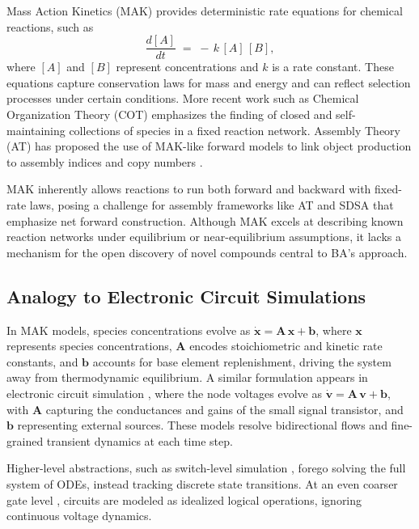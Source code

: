 \documentclass[preprint,12pt]{elsarticle}
\begin{document}
Mass Action Kinetics (MAK) \cite{TuranyiTomlin2014} provides deterministic rate equations for chemical reactions, such as
\[
\frac{d[A]}{dt} \;=\; -\,k\, [A]\,[B],
\]
where $[A]$ and $[B]$ represent concentrations and $k$ is a rate constant. These equations capture conservation laws for mass and energy and can reflect selection processes under certain conditions. More recent work such as Chemical Organization Theory (COT) \cite{DittrichFenizio2005} emphasizes the finding of closed and self-maintaining collections of species in a fixed reaction network. Assembly Theory (AT) has proposed the use of MAK-like forward models to link object production to assembly indices and copy numbers \cite{walker2023nature}.

MAK inherently allows reactions to run both forward and backward with fixed-rate laws, posing a challenge for assembly frameworks like AT and SDSA that emphasize net forward construction. Although MAK excels at describing known reaction networks under equilibrium or near-equilibrium assumptions, it lacks a mechanism for the open discovery of novel compounds central to BA’s approach.

\subsection{Analogy to Electronic Circuit Simulations}
\label{subsec:spice-analogy}

In MAK models, species concentrations evolve as
$\dot{\mathbf{x}} = \mathbf{A}\,\mathbf{x} + \mathbf{b}$, where \(\mathbf{x}\) represents species concentrations, \(\mathbf{A}\) encodes stoichiometric and kinetic rate constants, and \(\mathbf{b}\) accounts for base element replenishment, driving the system away from thermodynamic equilibrium. A similar formulation appears in electronic circuit simulation \cite{SpiceRef}, where the node voltages evolve as
$\dot{\mathbf{v}} = \mathbf{A}\,\mathbf{v} + \mathbf{b}$, with \(\mathbf{A}\) capturing the conductances and gains of the small signal transistor, and \(\mathbf{b}\) representing external sources. These models resolve bidirectional flows and fine-grained transient dynamics at each time step.

Higher-level abstractions, such as switch-level simulation \cite{AdlerCAD}, forego solving the full system of ODEs, instead tracking discrete state transitions. At an even coarser gate level \cite{FeynmanComp}, circuits are modeled as idealized logical operations, ignoring continuous voltage dynamics.
\end{document}
